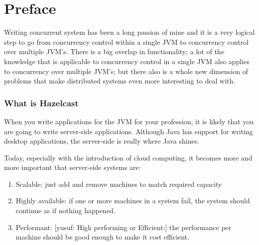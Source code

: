 \chapter*{Preface}
Writing concurrent system has been a long passion of mine and it is a very logical step to go from concurrency control within a single JVM to concurrency control over multiple JVM's. There is a big overlap in functionality; a lot of the knowledge that is applicable to concurrency control in a single JVM also applies to concurrency over multiple JVM's; but there also is a whole new dimension of problems that make distributed systems even more interesting to deal with. 
\subsection*{What is Hazelcast}
When you write applications for the JVM for your profession, it is likely that you are going to write server-side applications. Although Java has support for writing desktop applications, the server-side is really where Java shines.

Today, especially with the introduction of cloud computing, it becomes more and more important that server-side systems are:
\begin{enumerate}
\item Scalable: just add and remove machines to match required capacity 
\item Highly available: if one or more machines in a system fail, the system should continue as if nothing happened.
\item Performant: [yusuf: High performing or Efficient:] the performance per machine should be good enough to make it cost efficient.
\end{enumerate}

